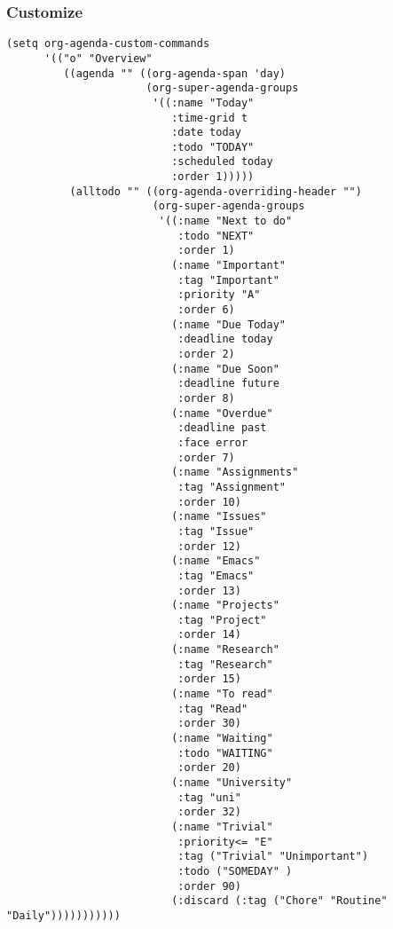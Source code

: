 \documentclass[c]{article}
\theoremstyle{plain}%
\theoremstyle{definition}
\theoremstyle{remark}
\begin{document}
\subsubsection{Customize}
\label{sec:orga576211}
\begin{verbatim}
(setq org-agenda-custom-commands
      '(("o" "Overview"
         ((agenda "" ((org-agenda-span 'day)
                      (org-super-agenda-groups
                       '((:name "Today"
                          :time-grid t
                          :date today
                          :todo "TODAY"
                          :scheduled today
                          :order 1)))))
          (alltodo "" ((org-agenda-overriding-header "")
                       (org-super-agenda-groups
                        '((:name "Next to do"
                           :todo "NEXT"
                           :order 1)
                          (:name "Important"
                           :tag "Important"
                           :priority "A"
                           :order 6)
                          (:name "Due Today"
                           :deadline today
                           :order 2)
                          (:name "Due Soon"
                           :deadline future
                           :order 8)
                          (:name "Overdue"
                           :deadline past
                           :face error
                           :order 7)
                          (:name "Assignments"
                           :tag "Assignment"
                           :order 10)
                          (:name "Issues"
                           :tag "Issue"
                           :order 12)
                          (:name "Emacs"
                           :tag "Emacs"
                           :order 13)
                          (:name "Projects"
                           :tag "Project"
                           :order 14)
                          (:name "Research"
                           :tag "Research"
                           :order 15)
                          (:name "To read"
                           :tag "Read"
                           :order 30)
                          (:name "Waiting"
                           :todo "WAITING"
                           :order 20)
                          (:name "University"
                           :tag "uni"
                           :order 32)
                          (:name "Trivial"
                           :priority<= "E"
                           :tag ("Trivial" "Unimportant")
                           :todo ("SOMEDAY" )
                           :order 90)
                          (:discard (:tag ("Chore" "Routine" "Daily")))))))))))
\end{verbatim}
\end{document}
